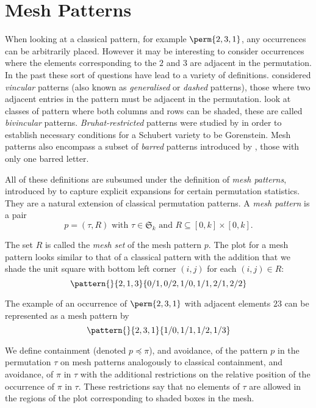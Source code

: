 \section{Mesh Patterns}
When looking at a classical pattern, for example \(\perm{2,3,1}\), any occurrences can be arbitrarily
placed. However it may be interesting to consider occurrences where the elements
corresponding to the \(2\) and \(3\) are adjacent in the permutation. In the past
these sort of questions have lead to a variety of definitions.  \textcite{babstein2000}
considered \emph{vincular} patterns (also known as \emph{generalised} or \emph{dashed} patterns),
those where two adjacent entries in the pattern must be adjacent in the permutation.
\textcite{MR2652101} look at classes of pattern where both columns and rows
can be shaded, these are called \emph{bivincular} patterns.
\emph{Bruhat-restricted} patterns were studied by \textcite{MR2264071} in order
to establish necessary conditions for a Schubert variety to be Gorenstein.
Mesh patterns also encompass a subset of \emph{barred} patterns introduced by
\textcite{MR2716312}, those with only one barred letter.

All of these definitions are subsumed under the definition of \emph{mesh patterns},
introduced by \textcite{journals/combinatorics/BrandenC11} to
capture explicit expansions for certain permutation statistics. They are a
natural extension of classical permutation patterns.
A \emph{mesh pattern} is a pair
\begin{equation*}
    p = (\tau,R)\text{ with } \tau \in \mathfrak{S}_k \text{ and } R \subseteq
    [0,k]\times [0,k].
\end{equation*}

The set \(R\) is called the \emph{mesh set} of the mesh pattern \(p\).
The plot for a mesh pattern looks similar to that of a classical pattern with the
addition that we shade the unit square with bottom left corner \((i,j)\) for each \((i,j) \in R\):
\begin{equation*}
    \pattern{}{ 2, 1, 3 }{ 0/1, 0/2, 1/0, 1/1, 2/1, 2/2 }
\end{equation*}

The example of an occurrence of \(\perm{2,3,1}\) with adjacent elements \(23\)
can be represented as a mesh pattern by
\begin{equation*}
  \pattern{}{2,3,1}{1/0,1/1,1/2,1/3}
\end{equation*}

We define containment (denoted \(p\preceq \pi\)), and avoidance, of the pattern \(p\) in the permutation
\(\tau\) on mesh patterns analogously to classical containment, and avoidance,
of \(\pi\) in \(\tau\) with the additional restrictions on the relative
position of the occurrence of \(\pi\) in \(\tau\). These restrictions say that
no elements of \(\tau\) are allowed in the regions of the plot corresponding
to shaded boxes in the mesh.

